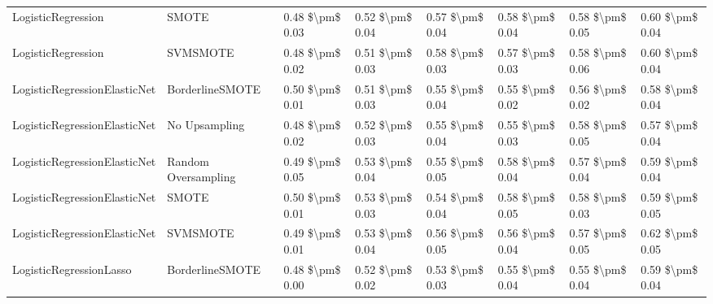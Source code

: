 \begin{tabular}{llllllll}
             LogisticRegression &                         SMOTE & 0.48 \$\textbackslash pm\$ 0.03 &           0.52 \$\textbackslash pm\$ 0.04 &       0.57 \$\textbackslash pm\$ 0.04 &        0.58 \$\textbackslash pm\$ 0.04 &                         0.58 \$\textbackslash pm\$ 0.05 &     0.60 \$\textbackslash pm\$ 0.04 \\
             LogisticRegression &                      SVMSMOTE & 0.48 \$\textbackslash pm\$ 0.02 &           0.51 \$\textbackslash pm\$ 0.03 &       0.58 \$\textbackslash pm\$ 0.03 &        0.57 \$\textbackslash pm\$ 0.03 &                         0.58 \$\textbackslash pm\$ 0.06 &     0.60 \$\textbackslash pm\$ 0.04 \\
   LogisticRegressionElasticNet &               BorderlineSMOTE & 0.50 \$\textbackslash pm\$ 0.01 &           0.51 \$\textbackslash pm\$ 0.03 &       0.55 \$\textbackslash pm\$ 0.04 &        0.55 \$\textbackslash pm\$ 0.02 &                         0.56 \$\textbackslash pm\$ 0.02 &     0.58 \$\textbackslash pm\$ 0.04 \\
   LogisticRegressionElasticNet &                 No Upsampling & 0.48 \$\textbackslash pm\$ 0.02 &           0.52 \$\textbackslash pm\$ 0.03 &       0.55 \$\textbackslash pm\$ 0.04 &        0.55 \$\textbackslash pm\$ 0.03 &                         0.58 \$\textbackslash pm\$ 0.05 &     0.57 \$\textbackslash pm\$ 0.04 \\
   LogisticRegressionElasticNet &           Random Oversampling & 0.49 \$\textbackslash pm\$ 0.05 &           0.53 \$\textbackslash pm\$ 0.04 &       0.55 \$\textbackslash pm\$ 0.05 &        0.58 \$\textbackslash pm\$ 0.04 &                         0.57 \$\textbackslash pm\$ 0.04 &     0.59 \$\textbackslash pm\$ 0.04 \\
   LogisticRegressionElasticNet &                         SMOTE & 0.50 \$\textbackslash pm\$ 0.01 &           0.53 \$\textbackslash pm\$ 0.03 &       0.54 \$\textbackslash pm\$ 0.04 &        0.58 \$\textbackslash pm\$ 0.05 &                         0.58 \$\textbackslash pm\$ 0.03 &     0.59 \$\textbackslash pm\$ 0.05 \\
   LogisticRegressionElasticNet &                      SVMSMOTE & 0.49 \$\textbackslash pm\$ 0.01 &           0.53 \$\textbackslash pm\$ 0.04 &       0.56 \$\textbackslash pm\$ 0.05 &        0.56 \$\textbackslash pm\$ 0.04 &                         0.57 \$\textbackslash pm\$ 0.05 &     0.62 \$\textbackslash pm\$ 0.05 \\
        LogisticRegressionLasso &               BorderlineSMOTE & 0.48 \$\textbackslash pm\$ 0.00 &           0.52 \$\textbackslash pm\$ 0.02 &       0.53 \$\textbackslash pm\$ 0.03 &        0.55 \$\textbackslash pm\$ 0.04 &                         0.55 \$\textbackslash pm\$ 0.04 &     0.59 \$\textbackslash pm\$ 0.04 \\

\end{tabular}
